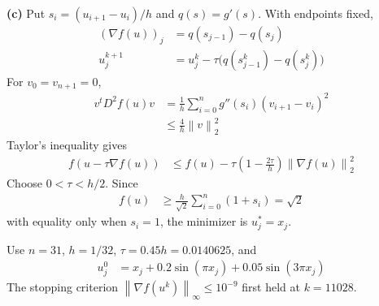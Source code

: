 \documentclass[12pt,letterpaper]{article}
\newcommand{\norm}[1]{\left\lVert #1\right\rVert}
\newcommand{\partlabel}[1]{\par\medskip\noindent\textbf{(#1)}\enspace}
\begin{document}
\partlabel{c}
Put $s_i=(u_{i+1}-u_i)/h$ and $q(s)=g'(s)$.
With endpoints fixed,
\begin{align*}
 (\nabla f(u))_j&=q(s_{j-1})-q(s_j)\\
 u_j^{k+1}&=u_j^k-\tau\bigl(q(s_{j-1}^k)-q(s_j^k)\bigr)
\end{align*}
For $v_0=v_{n+1}=0$,
\begin{align*}
 v^tD^2f(u)v
 &=\frac1h\sum_{i=0}^ng''(s_i)(v_{i+1}-v_i)^2\\
 &\le\frac4h\norm v_2^2
\end{align*}
Taylor's inequality gives
\begin{align*}
 f(u-\tau\nabla f(u))
 &\le f(u)-\tau\left(1-\frac{2\tau}{h}\right)\norm{\nabla f(u)}_2^2
\end{align*}
Choose $0<\tau<h/2$. Since
\begin{align*}
 f(u)&\ge\frac h{\sqrt2}\sum_{i=0}^n(1+s_i)=\sqrt2
\end{align*}
with equality only when $s_i=1$, the minimizer is $u_j^*=x_j$.

Use $n=31$, $h=1/32$, $\tau=0.45h=0.0140625$, and
\begin{align*}
 u_j^0&=x_j+0.2\sin(\pi x_j)+0.05\sin(3\pi x_j)
\end{align*}
The stopping criterion $\norm{\nabla f(u^k)}_\infty\le10^{-9}$
first held at $k=11028$.
\end{document}
